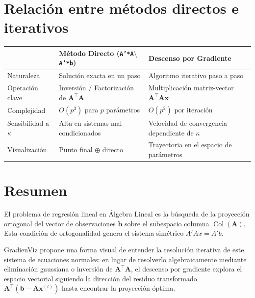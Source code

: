 ﻿\documentclass[12pt, a4paper]{article}
\newcommand{\T}{{\top}}
\begin{document}
\section{Relación entre métodos directos e iterativos}

\begin{center}
\small
\begin{tabular}{lll}
    \toprule
    & \textbf{Método Directo (\texttt{A'*A$\setminus$A'*b})} & \textbf{Descenso por Gradiente} \\
    \midrule
    Naturaleza              & Solución exacta en un paso       & Algoritmo iterativo paso a paso \\
    Operación clave         & Inversión / Factorización de $\mathbf{A}^\T \mathbf{A}$ & Multiplicación matriz-vector $\mathbf{A}^\T \mathbf{A} \mathbf{x}$ \\
    Complejidad             & $O(p^3)$ para $p$ parámetros     & $O(p^2)$ por iteración \\
    Sensibilidad a $\kappa$ & Alta en sistemas mal condicionados & Velocidad de convergencia dependiente de $\kappa$ \\
    Visualización           & Punto final $\oplus$ directo     & Trayectoria en el espacio de parámetros \\
    \bottomrule
\end{tabular}
\end{center}

\bigskip

\section*{Resumen}

El problema de regresión lineal en Álgebra Lineal es la búsqueda de la proyección ortogonal del vector de observaciones $\mathbf{b}$ sobre el subespacio columna $\operatorname{Col}(\mathbf{A})$. Esta condición de ortogonalidad genera el sistema simétrico $A'Ax = A'b$.

GradienViz propone una forma visual de entender la resolución iterativa de este sistema de ecuaciones normales: en lugar de resolverlo algebraicamente mediante eliminación gaussiana o inversión de $\mathbf{A}^\T\mathbf{A}$, el descenso por gradiente explora el espacio vectorial siguiendo la dirección del residuo transformado $\mathbf{A}^\T(\mathbf{b} - \mathbf{A}\mathbf{x}^{(t)})$ hasta encontrar la proyección óptima.
\end{document}
